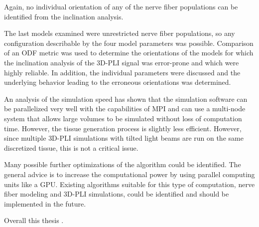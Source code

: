 Again, no individual orientation of any of the nerve fiber populations can be identified from the inclination analysis.
\par
% 
The last models examined were unrestricted nerve fiber populations, so any configuration describable by the four model parameters was possible.
Comparison of an \ac{ODF} metric was used to determine the orientations of the models for which the inclination analysis of the \ac{3D-PLI} signal was error-prone and which were highly reliable.
In addition, the individual parameters were discussed and the underlying behavior leading to the erroneous orientations was determined.
\par
% 
An analysis of the simulation speed has shown that the simulation software can be parallelized very well with the capabilities of \ac{MPI} and can use a multi-node system that allows large volumes to be simulated without loss of computation time.
However, the tissue generation process is slightly less efficient.
However, since multiple \ac{3D-PLI} simulations with tilted light beams are run on the same discretized tissue, this is not a critical issue.
\par
% 
Many possible further optimizations of the algorithm could be identified.
The general advice is to increase the computational power by using parallel computing units like a \ac{GPU}.
Existing algorithms suitable for this type of computation, nerve fiber modeling and \ac{3D-PLI} simulations, could be identified and should be implemented in the future.
\par
% 
Overall this thesis \dummy{}.